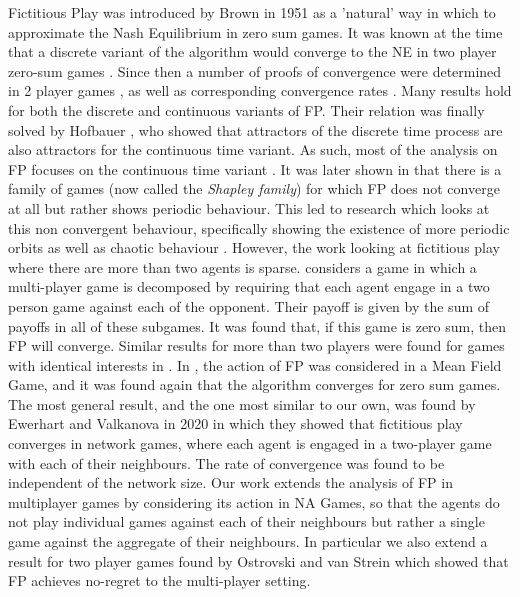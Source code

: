 \documentclass{article}
\theoremstyle{definition}
\begin{document}
Fictitious Play was introduced by Brown in 1951 \cite{BrownPublished, BrownUnpublished} as a
'natural' way in which to approximate the Nash Equilibrium in zero sum games. It was known at the
time that a discrete variant of the algorithm would converge to the NE in two player zero-sum games
\cite{Robinson}. Since then a number of proofs of convergence were determined in 2 player games
\cite{Miyasawa, Polak, Berger, Monderer and Sela, Monderer and Shapley}, as well as corresponding
convergence rates \cite{Harris, Shapiro}. Many results hold for both the discrete and continuous
variants of FP. Their relation was finally solved by Hofbauer \cite{Hofbauer}, who showed that
attractors of the discrete time process are also attractors for the continuous time variant. As
such, most of the analysis on FP focuses on the continuous time variant \cite{Ostrovski}. It was
later shown in \cite{Shapley} that there is a family of games (now called the \emph{Shapley family})
for which FP does not converge at all but rather shows periodic behaviour. This led to research
which looks at this non convergent behaviour, specifically showing the existence of more periodic
orbits as well as chaotic behaviour \cite{Sparrow}. However, the work looking at fictitious play
where there are more than two agents is sparse. \cite{Sela} considers a game in which a multi-player
game is decomposed by requiring that each agent engage in a two person game against each of the
opponent. Their payoff is given by the sum of payoffs in all of these subgames. It was found that,
if this game is zero sum, then FP will converge. Similar results for more than two players were
found for games with identical interests in \cite{MondererShapley1994}. In \cite{FPMFG}, the action
of FP was considered in a Mean Field Game, and it was found again that the algorithm converges for
zero sum games. The most general result, and the one most similar to our own, was found by Ewerhart
and Valkanova in 2020 \cite{Ewerhart} in which they showed that fictitious play converges in network
games, where each agent is engaged in a two-player game with each of their neighbours. The rate of
convergence was found to be independent of the network size.  Our work extends the analysis of FP in
multiplayer games by considering its action in NA Games, so that the agents do not play individual
games against each of their neighbours but rather a single game against the aggregate of their
neighbours. In particular we also extend a result for two player games found by Ostrovski and van
Strein \cite{Payoff Performance} which showed that FP achieves no-regret to the multi-player
setting.
\end{document}
